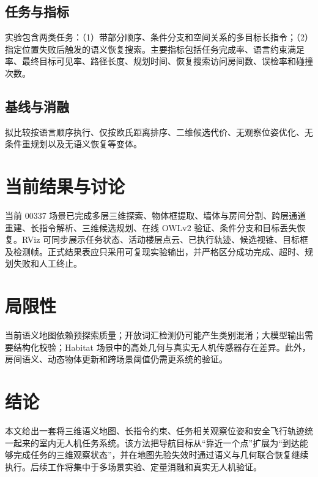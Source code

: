 \documentclass[UTF8,11pt]{ctexart}
\begin{document}
\subsection{任务与指标}
实验包含两类任务：（1）带部分顺序、条件分支和空间关系的多目标长指令；（2）指定位置失败后触发的语义恢复搜索。主要指标包括任务完成率、语言约束满足率、最终目标可见率、路径长度、规划时间、恢复搜索访问房间数、误检率和碰撞次数。

\subsection{基线与消融}
拟比较按语言顺序执行、仅按欧氏距离排序、二维候选代价、无观察位姿优化、无条件重规划以及无语义恢复等变体。

\section{当前结果与讨论}
当前 00337 场景已完成多层三维探索、物体框提取、墙体与房间分割、跨层通道重建、长指令解析、三维候选规划、在线 OWLv2 验证、条件分支和目标丢失恢复。RViz 可同步展示任务状态、活动楼层点云、已执行轨迹、候选视锥、目标框及检测帧。正式结果表应只采用可复现实验输出，并严格区分成功完成、超时、规划失败和人工终止。

\section{局限性}
当前语义地图依赖预探索质量；开放词汇检测仍可能产生类别混淆；大模型输出需要结构化校验；Habitat 场景中的高处几何与真实无人机传感器存在差异。此外，房间语义、动态物体更新和跨场景阈值仍需更系统的验证。

\section{结论}
本文给出一套将三维语义地图、长指令约束、任务相关观察位姿和安全飞行轨迹统一起来的室内无人机任务系统。该方法把导航目标从“靠近一个点”扩展为“到达能够完成任务的三维观察状态”，并在地图先验失效时通过语义与几何联合恢复继续执行。后续工作将集中于多场景实验、定量消融和真实无人机验证。

\printbibliography
\end{document}
